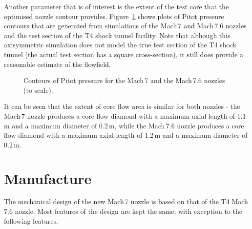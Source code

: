 \documentclass[12pt,a4paper]{article}
\begin{document}
Another parameter that is of interest is the extent of the test core that 
the optimised nozzle contour provides. Figure~\ref{f:full-simulation} shows
plots of Pitot pressure contours that are generated from simulations of the 
Mach\,7 and Mach\,7.6 nozzles and the test section of the T4 shock tunnel 
facility. Note that although this axisymmetric simulation does not model the 
true test section of the T4 shock tunnel (the actual test section has a 
square cross-section), it still does provide a reasonable estimate of the 
flowfield.
%
\begin{figure}[htbp]
 \begin{center}
  \quad
  \caption{Contours of Pitot pressure for the Mach\,7 and the Mach\,7.6 nozzles (to scale).}
  \label{f:full-simulation}
 \end{center}
\end{figure}
%
It can be seen that the extent of core flow area is similar for both 
nozzles - the Mach\,7 nozzle produces a core flow diamond with a maximum
axial length of 1.1\,m and a maximum diameter of 0.2\,m, while the Mach\,7.6 
nozzle produces a core flow diamond with a maximum axial length of 1.2\,m and 
a maximum diameter of 0.2\,m.


\section{Manufacture}
\label{sec:nozzle-manufacture}
%
The mechanical design of the new Mach\,7 nozzle is based on that of the T4 
Mach\,7.6 nozzle. Most features of the design are kept the same, with exception to 
the following features.
\end{document}
